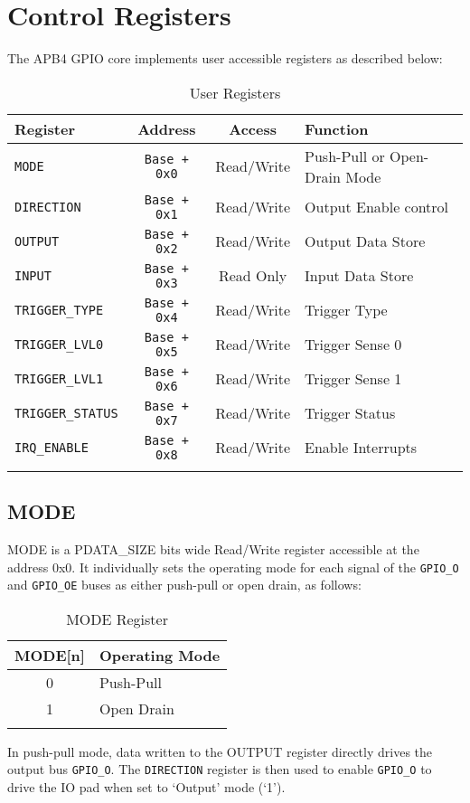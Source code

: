 \section{Control Registers}\label{registers}

The APB4 GPIO core implements user accessible registers as described below:

\begin{longtable}[]{@{}lccl@{}}
\toprule
\textbf{Register} & \textbf{Address} & \textbf{Access} & \textbf{Function}\tabularnewline
\midrule
\endhead
\texttt{MODE} & \texttt{Base + 0x0} & Read/Write & Push-Pull or Open-Drain Mode\tabularnewline
\texttt{DIRECTION} & \texttt{Base + 0x1} & Read/Write & Output Enable control\tabularnewline
\texttt{OUTPUT} & \texttt{Base + 0x2} & Read/Write & Output Data Store\tabularnewline
\texttt{INPUT} & \texttt{Base + 0x3} & Read Only & Input Data Store\tabularnewline
\texttt{TRIGGER\_TYPE} & \texttt{Base + 0x4} & Read/Write & Trigger Type\tabularnewline
\texttt{TRIGGER\_LVL0} & \texttt{Base + 0x5} & Read/Write & Trigger Sense 0\tabularnewline
\texttt{TRIGGER\_LVL1} & \texttt{Base + 0x6} & Read/Write & Trigger Sense 1\tabularnewline
\texttt{TRIGGER\_STATUS} & \texttt{Base + 0x7} & Read/Write & Trigger Status\tabularnewline
\texttt{IRQ\_ENABLE} & \texttt{Base + 0x8} & Read/Write & Enable Interrupts\tabularnewline
\bottomrule
\caption{User Registers}
\end{longtable}

\subsection{MODE}\label{mode}

MODE is a PDATA\_SIZE bits wide Read/Write register accessible at the
address 0x0. It individually sets the operating mode for each signal of
the \texttt{GPIO\_O} and \texttt{GPIO\_OE} buses as either push-pull or open drain, as
follows:

\begin{longtable}[]{@{}cl@{}}
\toprule
\textbf{MODE[n]} & \textbf{Operating Mode}\tabularnewline
\midrule
\endhead
0 & Push-Pull\tabularnewline
1 & Open Drain\tabularnewline
\bottomrule
\caption{MODE Register}
\end{longtable}

In push-pull mode, data written to the OUTPUT register directly drives
the output bus \texttt{GPIO\_O}. The \texttt{DIRECTION} register is then used to enable
\texttt{GPIO\_O} to drive the IO pad when set to `Output' mode (`1').


